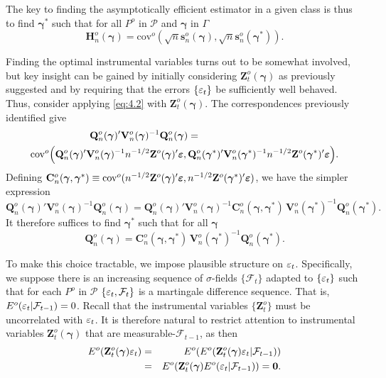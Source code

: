 The key to finding the asymptotically efficient estimator in a given class
is thus to find $\boldsymbol{\gamma}^*$ such that for all $P^o$ in $\mathcal{P}$ and $\boldsymbol{\gamma}$ in $\Gamma$
\[
\mathbf{H}_n^o(\boldsymbol{\gamma}) = \mathrm{cov}^o\left(\sqrt{n}\mathbf{s}_n^o(\boldsymbol{\gamma}), \sqrt{n}\mathbf{s}_n^o(\boldsymbol{\gamma}^*)\right).
\]

Finding the optimal instrumental variables turns out to be somewhat
involved, but key insight can be gained by initially considering $\mathbf{Z}_t^o(\boldsymbol{\gamma})$ as
previously suggested and by requiring that the errors $\{\varepsilon_t\}$ be sufficiently
well behaved. Thus, consider applying \eqref{eq:4.2} with $\mathbf{Z}_t^o(\boldsymbol{\gamma})$. The correspondences previously identified give
\begin{align*}
\mathbf{Q}_n^o(\boldsymbol{\gamma})'\mathbf{V}_n^o(\boldsymbol{\gamma})^{-1}\mathbf{Q}_n^o(\boldsymbol{\gamma}) &= \\
\mathrm{cov}^o\Big(\mathbf{Q}_n^o(\boldsymbol{\gamma})'\mathbf{V}_n^o(\boldsymbol{\gamma})^{-1}n^{-1/2}\mathbf{Z}^o(\boldsymbol{\gamma})'\boldsymbol{\varepsilon},\, &\mathbf{Q}_n^o(\boldsymbol{\gamma}^*)'\mathbf{V}_n^o(\boldsymbol{\gamma}^*)^{-1}n^{-1/2}\mathbf{Z}^o(\boldsymbol{\gamma}^*)'\boldsymbol{\varepsilon}\Big).
\end{align*}
Defining $\mathbf{C}_n^o(\boldsymbol{\gamma}, \boldsymbol{\gamma}^*) \equiv \mathrm{cov}^o(n^{-1/2}\mathbf{Z}^o(\boldsymbol{\gamma})'\boldsymbol{\varepsilon}, n^{-1/2}\mathbf{Z}^o(\boldsymbol{\gamma}^*)'\boldsymbol{\varepsilon})$, we have the simpler expression
\[
\mathbf{Q}_n^o(\boldsymbol{\gamma})'\mathbf{V}_n^o(\boldsymbol{\gamma})^{-1}\mathbf{Q}_n^o(\boldsymbol{\gamma}) = \mathbf{Q}_n^o(\boldsymbol{\gamma})'\mathbf{V}_n^o(\boldsymbol{\gamma})^{-1}\mathbf{C}_n^o(\boldsymbol{\gamma}, \boldsymbol{\gamma}^*)\,\mathbf{V}_n^o(\boldsymbol{\gamma}^*)^{-1}\mathbf{Q}_n^o(\boldsymbol{\gamma}^*).
\]
It therefore suffices to find $\boldsymbol{\gamma}^*$ such that for all $\boldsymbol{\gamma}$
\begin{equation}\label{eq:4.3}
\mathbf{Q}_n^o(\boldsymbol{\gamma}) = \mathbf{C}_n^o(\boldsymbol{\gamma}, \boldsymbol{\gamma}^*)\,\mathbf{V}_n^o(\boldsymbol{\gamma}^*)^{-1}\mathbf{Q}_n^o(\boldsymbol{\gamma}^*).
\end{equation}

To make this choice tractable, we impose plausible structure on $\varepsilon_t$.
Specifically, we suppose there is an increasing sequence of $\sigma$-fields $\{\mathcal{F}_t\}$
adapted to $\{\varepsilon_t\}$ such that for each $P^o$ in $\mathcal{P}$ $\{\varepsilon_t, \mathcal{F}_t\}$ is a martingale difference sequence. That is, $E^o(\varepsilon_t|\mathcal{F}_{t-1}) = 0$. Recall that the instrumental
variables $\{\mathbf{Z}_t^o\}$ must be uncorrelated with $\varepsilon_t$. It is therefore natural to restrict attention to instrumental variables $\mathbf{Z}_t^o(\boldsymbol{\gamma})$ that are measurable-$\mathcal{F}_{t-1}$,
as then
\begin{eqnarray*}
E^o(\mathbf{Z}_t^o(\boldsymbol{\gamma})\varepsilon_t) &=& E^o(E^o(\mathbf{Z}_t^o(\boldsymbol{\gamma})\varepsilon_t|\mathcal{F}_{t-1}))\\
&=& E^o(\mathbf{Z}_t^o(\boldsymbol{\gamma})E^o(\varepsilon_t|\mathcal{F}_{t-1})) = \mathbf{0}.
\end{eqnarray*}

